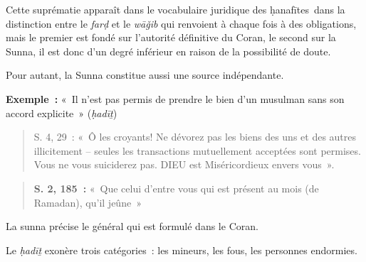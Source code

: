 Cette suprématie apparaît dans le vocabulaire juridique des
ḥanafītes~dans la distinction entre le \emph{farḍ} et le \emph{wāǧib}
qui renvoient à chaque fois à des obligations, mais le premier est fondé
sur l'autorité définitive du Coran, le second sur la Sunna, il est donc
d'un degré inférieur en raison de la possibilité de doute.

Pour autant, la Sunna constitue aussi une source indépendante.



\textbf{Exemple~:} «~Il n'est pas permis de prendre le bien d'un
musulman sans son accord explicite~» (\emph{ḥadīṯ})
\begin{quote}
   S. 4, 29~: «~Ô les croyants! Ne dévorez pas les biens des uns et des
autres illicitement -- seules les transactions mutuellement acceptées
sont permises. Vous ne vous suiciderez pas. DIEU est Miséricordieux
envers vous~».
 
\end{quote}

\begin{quote}
  \textbf{S. 2, 185~:} «~Que celui d'entre vous qui est présent au mois
(de Ramadan), qu'il jeûne~»

  
\end{quote}

La sunna précise le général qui est formulé dans le Coran.

Le \emph{ḥadīṯ} exonère trois catégories~: les mineurs, les fous, les
personnes endormies.

